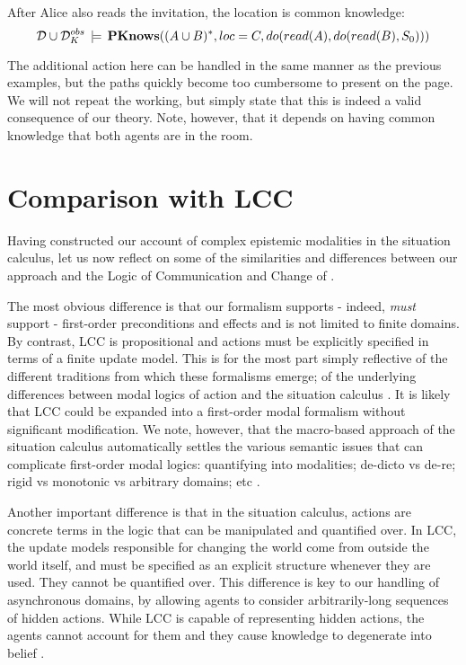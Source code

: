 ~

\begin{example}
After Alice also reads the invitation, the location is common knowledge:\[
\mathcal{D}\cup\mathcal{D}_{K}^{obs}\,\models\,\mathbf{PKnows}((A\cup B)^{*},loc=C,do(read(A),do(read(B),S_{0})))\]

\end{example}
The additional action here can be handled in the same manner as the
previous examples, but the paths quickly become too cumbersome to
present on the page. We will not repeat the working, but simply state
that this is indeed a valid consequence of our theory. Note, however,
that it depends on having common knowledge that both agents are in
the room.


\section{Comparison with LCC\label{sec:CKnowledge:Comparison}}

Having constructed our account of complex epistemic modalities in
the situation calculus, let us now reflect on some of the similarities
and differences between our approach and the Logic of Communication
and Change of \citet{vanBenthem06lcc}.

The most obvious difference is that our formalism supports - indeed,
\emph{must} support - first-order preconditions and effects and is
not limited to finite domains. By contrast, LCC is propositional and
actions must be explicitly specified in terms of a finite update model.
This is for the most part simply reflective of the different traditions
from which these formalisms emerge; of the underlying differences
between modal logics of action and the situation calculus \citep{vanbentham07ml_sitcalc}.
It is likely that LCC could be expanded into a first-order modal formalism
without significant modification. We note, however, that the macro-based
approach of the situation calculus automatically settles the various
semantic issues that can complicate first-order modal logics: quantifying
into modalities; de-dicto vs de-re; rigid vs monotonic vs arbitrary
domains; etc \citep{fitting98fo_ml}.

Another important difference is that in the situation calculus, actions
are concrete terms in the logic that can be manipulated and quantified
over. In LCC, the update models responsible for changing the world
come from outside the world itself, and must be specified as an explicit
structure whenever they are used. They cannot be quantified over.
This difference is key to our handling of asynchronous domains, by
allowing agents to consider arbitrarily-long sequences of hidden actions.
While LCC is capable of representing hidden actions, the agents cannot
account for them and they cause knowledge to degenerate into belief
\citep[section 5.2]{vanBenthem06lcc}.

